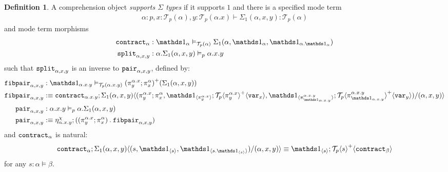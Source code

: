 \documentclass[10pt]{article}
\theoremstyle{definition}
\newtheorem{definition}{Definition}
\newcommand\TrPlus[2]{\ensuremath{{#1}^+(#2)}}
\newcommand\El[2]{\mathcal{T}_{#1}(#2)}
\newcommand\ApEl[2]{\mathcal{T}_{#1}\langle#2\rangle}
\newcommand\bdot[0]{\mathbin{.}}
\newcommand\ap[2]{\ensuremath{#1 \langle #2 \rangle }}
\newcommand\ApPlus[2]{\ensuremath{{#1}^+ \langle #2 \rangle }}
\begin{document}
\begin{definition}\label{def:supports-sigmas}
A comprehension object \emph{supports $\Sigma$ types} if it supports $1$ and there is a specified mode term
\begin{align*}
\alpha : p, x : \El{p}{\alpha}, y : \El{p}{\alpha.x} \vdash \Sigma_1(\alpha,x,y) : \El{p}{\alpha}
\end{align*}
and mode term morphisms
\begin{align*}
\contract{\alpha} &: \One_\alpha \vDash_{\El{p}{\alpha}} \Sigma_1(\alpha,\One_\alpha,\One_{\alpha.{\One_\alpha}}) \\
\tsplit{\alpha,x,y} &: \alpha.\Sigma_1(\alpha,x,y) \vDash_{p} \alpha.x.y
\end{align*}
such that $\mathtt{split}_{\alpha,x,y}$ is an inverse to $\mathtt{pair}_{\alpha,x,y}$, defined by:
\begin{align*}
\fibpair{\alpha,x,y} &: \One_{\alpha.x.y} \vDash_{\El{p}{\alpha.x.y}} \TrPlus{(\pi^{\alpha.x}_y;\pi^\alpha_x)}{\Sigma_1(\alpha,x,y)} \\
\fibpair{\alpha,x,y} &:\equiv \contract{\alpha.x.y};\ap{\Sigma_1(\alpha,x,y)}{(\pi^{\alpha.x}_y;\pi^{\alpha}_x,\ApOne{\pi^{\alpha.x}_y};\ApPlus{\ApEl{p}{\pi^{\alpha.x}_y}}{\var{x}}, \ApOne{\pi^{\alpha.x.y}_{\One_{\alpha.x.y}}};\ApPlus{\ApEl{p}{\pi^{\alpha.x.y}_{\One_{\alpha.x.y}}}}{\var{y}})/(\alpha,x,y)} \\
\pair{\alpha,x,y} &: \alpha.x.y \vDash_{p} \alpha.\Sigma_1(\alpha,x,y) \\
\pair{\alpha, x, y} &:\equiv \eta^\chi_{\alpha.x.y};((\pi^{\alpha.x}_y;\pi^\alpha_x) \bdot \fibpair{\alpha,x,y})
\end{align*}
and $\mathtt{contract}_{\alpha}$ is natural:
\begin{align}
\contract{\alpha};\ap{\Sigma_1(\alpha,x,y)}{(s, \ApOne{s}, \ApOne{s \bdot \ApOne{s}})/(\alpha,x,y)} \equiv \ApOne{s};\ApPlus{\ApEl{p}{s}}{\contract{\beta}}
\end{align}
for any $s : \alpha \vDash \beta$.
\end{definition}
\end{document}
